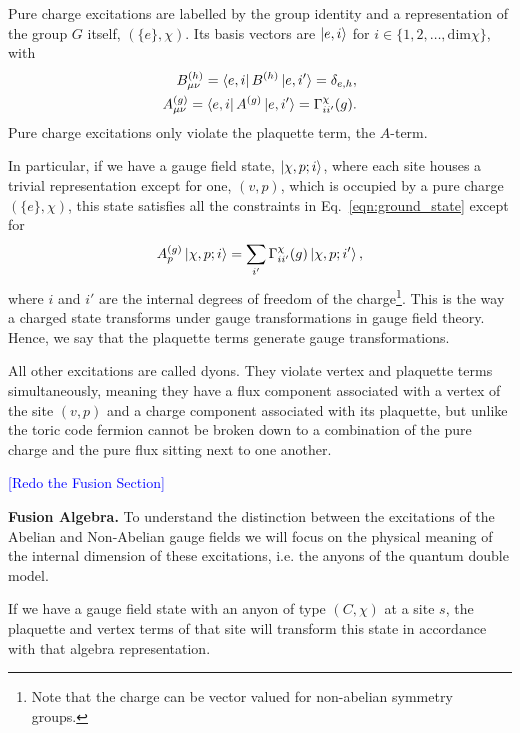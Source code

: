 \documentclass[two column]{article}
\newcommand{\jovan}[1]{\textcolor{blue}{[#1]}}
\begin{document}
Pure charge excitations are labelled by the group identity and a representation of the group $G$ itself, $(\{e\}, \chi)$. Its basis vectors are $\ket{e, i}$ for $i \in \{1, 2, \ldots, \text{dim}\chi\}$, with
\begin{equation}
    \begin{split}
        B^{(h)}_{\mu\nu}=\bra{e, i} B^{(h)} \ket{e, i'} = \delta_{e, h},\\
        A^{(g)}_{\mu\nu} = \bra{e, i} A^{(g)} \ket{e, i'} = \Gamma^\chi_{ii'}(g).
    \end{split}
\end{equation}
Pure charge excitations only violate the plaquette term, the $A$-term.


In particular, if we have a gauge field state, $\ket{\chi, p; i}$, where each site houses a trivial representation except for one, $(v, p)$, which is occupied by a pure charge $(\{e\}, \chi)$, this state satisfies all the constraints in Eq.~\eqref{eqn:ground_state} except for
\begin{equation}
    A_p^{(g)}\ket{\chi, p; i} = \sum_{i'} \Gamma^\chi_{ii'}(g)\ket{\chi, p; i'},\label{eqn:tranfs}
\end{equation}
where $i$ and $i'$ are the internal degrees of freedom of the charge\footnote{Note that the charge can be vector valued for non-abelian symmetry groups.}.
This is the way a charged state transforms under gauge transformations in gauge field theory. Hence, we say that the plaquette terms generate gauge transformations.

All other excitations are called dyons. They violate vertex and plaquette terms simultaneously, meaning they have a flux component associated with a vertex of the site $(v,p)$ and a charge component associated with its plaquette, but unlike the toric code fermion cannot be broken down to a combination of the pure charge and the pure flux sitting next to one another.

\jovan{Redo the Fusion Section}

\textbf{Fusion Algebra.} To understand the distinction between the excitations of the Abelian and Non-Abelian gauge fields we will focus on the physical meaning of the internal dimension of these excitations, i.e. the anyons of the quantum double model.

If we have a gauge field state with an anyon of type $(C, \chi)$ at a site $s$, the plaquette and vertex terms of that site will transform this state in accordance with that algebra representation.
\end{document}

